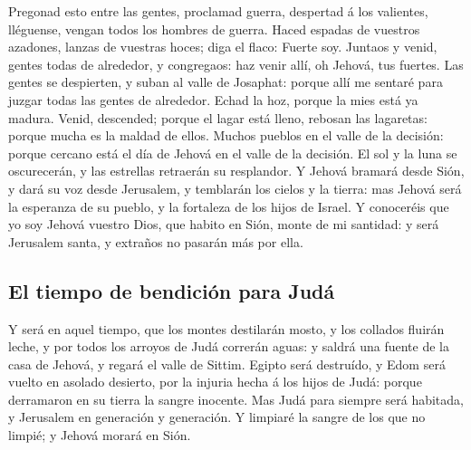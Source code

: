  Pregonad esto entre las gentes, proclamad guerra, despertad
á los valientes, lléguense, vengan todos los hombres de guerra.
 Haced espadas de vuestros azadones, lanzas de vuestras
hoces; diga el flaco: Fuerte soy.  Juntaos y venid, gentes
todas de alrededor, y congregaos: haz venir allí, oh Jehová, tus
fuertes.  Las gentes se despierten, y suban al valle de
Josaphat: porque allí me sentaré para juzgar todas las gentes de
alrededor.  Echad la hoz, porque la mies está ya madura.
Venid, descended; porque el lagar está lleno, rebosan las lagaretas:
porque mucha es la maldad de ellos.  Muchos pueblos en el
valle de la decisión: porque cercano está el día de Jehová en el valle
de la decisión.  El sol y la luna se oscurecerán, y las
estrellas retraerán su resplandor.  Y Jehová bramará desde
Sión, y dará su voz desde Jerusalem, y temblarán los cielos y la tierra:
mas Jehová será la esperanza de su pueblo, y la fortaleza de los hijos
de Israel.  Y conoceréis que yo soy Jehová vuestro Dios,
que habito en Sión, monte de mi santidad: y será Jerusalem santa, y
extraños no pasarán más por ella.

\hypertarget{el-tiempo-de-bendiciuxf3n-para-juduxe1}{%
\subsection{El tiempo de bendición para
Judá}\label{el-tiempo-de-bendiciuxf3n-para-juduxe1}}

 Y será en aquel tiempo, que los montes destilarán mosto, y
los collados fluirán leche, y por todos los arroyos de Judá correrán
aguas: y saldrá una fuente de la casa de Jehová, y regará el valle de
Sittim.  Egipto será destruído, y Edom será vuelto en
asolado desierto, por la injuria hecha á los hijos de Judá: porque
derramaron en su tierra la sangre inocente.  Mas Judá para
siempre será habitada, y Jerusalem en generación y generación.
 Y limpiaré la sangre de los que no limpié; y Jehová morará
en Sión.
